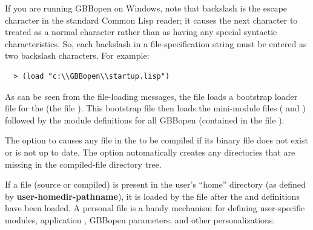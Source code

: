\documentclass[10pt,twoside,english,pdftex]{article}
\begin{document}
%
%
If you are running GBBopen on Windows, note that backslash is the
escape character in the standard Common Lisp reader; it causes the
next character to treated as a normal character rather than as having
any special syntactic characteristics. So, each backslash in a
file-specification string must be entered as two backslash characters.
For example:
%
\W\supp
\begin{verbatim}
  > (load "c:\\GBBopen\\startup.lisp")
\end{verbatim}
%
As can be seen from the file-loading messages, the  file
loads a bootstrap loader file for the  (the file
).  This bootstrap file then
loads the mini-module files ( and
) followed by the module
definitions for all GBBopen  (contained in the file
).

%
%
The  option to \textbf{} causes
any file in the  to be compiled if its binary file
does not exist or is not up to date.  The  option
automatically creates any directories that are missing in the compiled-file
directory tree.


%
%
%
%
%
%
If a  file (source or compiled) is present in the
user's ``home'' directory (as defined by \textbf{user-homedir-pathname}), it
is loaded by the  file after
the  and definitions have been
loaded.  A personal  file is a handy
mechanism for defining user-specific modules, application ,
GBBopen parameters, and other personalizations.
\end{document}
